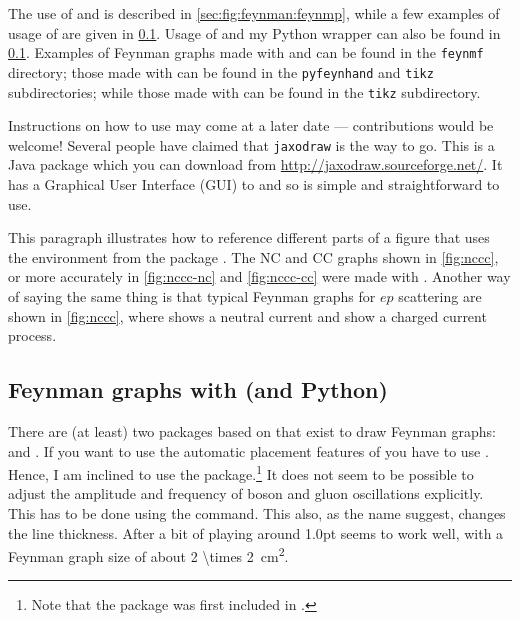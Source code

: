 The use of  and  is
described in \cref{sec:fig:feynman:feynmp}, while a few
examples of usage of \Package{\TikZ} are given in
\cref{sec:fig:feynman:tikz}.
Usage of  and my Python wrapper 
can also be found in \cref{sec:fig:feynman:tikz}.
Examples of Feynman graphs made
with  and  can be found in the \texttt{feynmf} directory;
those made with  can be found in the \texttt{pyfeynhand} and \texttt{tikz} subdirectories;
while those made with \Package{\TikZ} can be found in the \texttt{tikz} subdirectory.

Instructions on how to use  may come at a later
date --- contributions would be welcome! Several people have claimed
that \texttt{jaxodraw} is the way to go. This is a Java package which
you can download from \url{http://jaxodraw.sourceforge.net/}. It has
a Graphical User Interface (GUI) to  and so is simple and
straightforward to use.

\begin{tcblisting}{}
This paragraph illustrates how to reference different parts of a
figure that uses the environment  from
the package .
The NC and CC graphs shown in \cref{fig:nccc}, or more accurately
in \cref{fig:nccc-nc} and \cref{fig:nccc-cc} were made with .
Another way of saying the same thing is that typical Feynman graphs
for \(ep\) scattering are shown in \cref{fig:nccc},
where  shows a neutral current and 
show a charged current process.
\end{tcblisting}


\subsection{Feynman graphs with \TikZ (and Python)}%
\label{sec:fig:feynman:tikz}

There are (at least) two packages based on \TikZ that exist to draw Feynman graphs:
 and .
If you want to use the automatic placement features of 
you have to use \LuaLaTeX.
Hence, I am inclined to use the  package.\footnote{%
Note that the  package was first included in .}
It does not seem to be possible to adjust the amplitude and frequency
of boson and gluon oscillations explicitly.
This has to be done using the  command.
This also, as the name suggest, changes the line thickness.
After a bit of playing around \num{1.0}{pt} seems to work well,
with a Feynman graph size of about \qty[parse-numbers=false]{2 \times 2}{\cm^{2}}.

